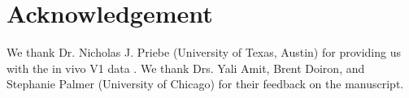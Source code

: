 \section{Acknowledgement}

We thank Dr. Nicholas J. Priebe (University of Texas, Austin)
    for providing us with the in vivo V1 data \citep{Li2020-ej}.
We thank Drs. Yali Amit, Brent Doiron, and Stephanie Palmer (University of Chicago)
    for their feedback on the manuscript.
